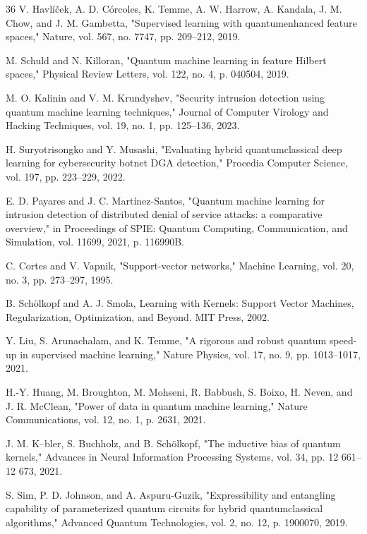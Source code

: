 \begin{thebibliography}{36}
V. Havl\'i\v{c}ek, A. D. C\'orcoles, K. Temme, A. W. Harrow, A. Kandala, J. M. Chow, and J. M. Gambetta, "Supervised learning with quantumenhanced feature spaces," Nature, vol. 567, no. 7747, pp. 209--212, 2019.

M. Schuld and N. Killoran, "Quantum machine learning in feature Hilbert spaces," Physical Review Letters, vol. 122, no. 4, p. 040504, 2019.

M. O. Kalinin and V. M. Krundyshev, "Security intrusion detection using quantum machine learning techniques," Journal of Computer Virology and Hacking Techniques, vol. 19, no. 1, pp. 125--136, 2023.

H. Suryotrisongko and Y. Musashi, "Evaluating hybrid quantumclassical deep learning for cybersecurity botnet DGA detection," Procedia Computer Science, vol. 197, pp. 223--229, 2022.

\begin{revbody}
E. D. Payares and J. C. Mart\'inez-Santos, "Quantum machine learning for intrusion detection of distributed denial of service attacks: a comparative overview," in Proceedings of SPIE: Quantum Computing, Communication, and Simulation, vol. 11699, 2021, p. 116990B.
\end{revbody}

C. Cortes and V. Vapnik, "Support-vector networks," Machine Learning, vol. 20, no. 3, pp. 273--297, 1995.

B. Sch\"olkopf and A. J. Smola, Learning with Kernels: Support Vector Machines, Regularization, Optimization, and Beyond. MIT Press, 2002.

Y. Liu, S. Arunachalam, and K. Temme, "A rigorous and robust quantum speed-up in supervised machine learning," Nature Physics, vol. 17, no. 9, pp. 1013--1017, 2021.

H.-Y. Huang, M. Broughton, M. Mohseni, R. Babbush, S. Boixo, H. Neven, and J. R. McClean, "Power of data in quantum machine learning," Nature Communications, vol. 12, no. 1, p. 2631, 2021.

J. M. K--bler, S. Buchholz, and B. Sch\"olkopf, "The inductive bias of quantum kernels," Advances in Neural Information Processing Systems, vol. 34, pp. 12 661--12 673, 2021.

S. Sim, P. D. Johnson, and A. Aspuru-Guzik, "Expressibility and entangling capability of parameterized quantum circuits for hybrid quantumclassical algorithms," Advanced Quantum Technologies, vol. 2, no. 12, p. 1900070, 2019.


\end{thebibliography}

